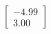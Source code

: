 \documentclass[preview]{standalone}
\begin{document}
\begin{align*}
\begin{bmatrix} -4.99 \\ 3.00 \end{bmatrix}
\end{align*}
\end{document}
